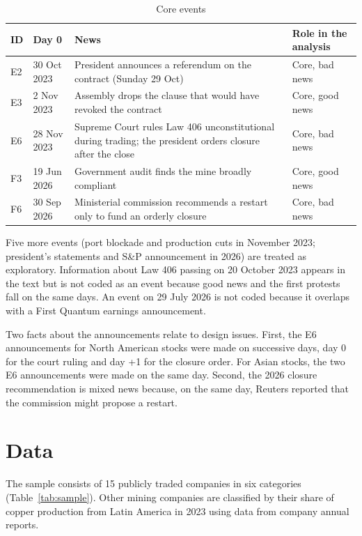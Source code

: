 \documentclass[11pt]{article}
\begin{document}
\begin{table}[h]
\centering
\caption{Core events}
\label{tab:events}
\small
\begin{tabularx}{\textwidth}{l l L l}
\toprule
ID & Day 0 & News & Role in the analysis \\
\midrule
E2 & 30 Oct 2023 & President announces a referendum on the contract (Sunday 29 Oct) & Core, bad news \\
E3 & 2 Nov 2023 & Assembly drops the clause that would have revoked the contract & Core, good news \\
E6 & 28 Nov 2023 & Supreme Court rules Law 406 unconstitutional during trading; the president orders closure after the close & Core, bad news \\
F3 & 19 Jun 2026 & Government audit finds the mine broadly compliant & Core, good news \\
F6 & 30 Sep 2026 & Ministerial commission recommends a restart only to fund an orderly closure & Core, bad news \\
\bottomrule
\end{tabularx}
\end{table}

Five more events (port blockade and production cuts in November 2023; president's statements and S\&P announcement in 2026) are treated as exploratory. Information about Law 406 passing on 20 October 2023 appears in the text but is not coded as an event because good news and the first protests fall on the same days. An event on 29 July 2026 is not coded because it overlaps with a First Quantum earnings announcement.

Two facts about the announcements relate to design issues. First, the E6 announcements for North American stocks were made on successive days, day 0 for the court ruling and day +1 for the closure order. For Asian stocks, the two E6 announcements were made on the same day. Second, the 2026 closure recommendation is mixed news because, on the same day, Reuters reported that the commission might propose a restart.

\section{Data}

The sample consists of 15 publicly traded companies in six categories (Table~\ref{tab:sample}). Other mining companies are classified by their share of copper production from Latin America in 2023 using data from company annual reports.
\end{document}
